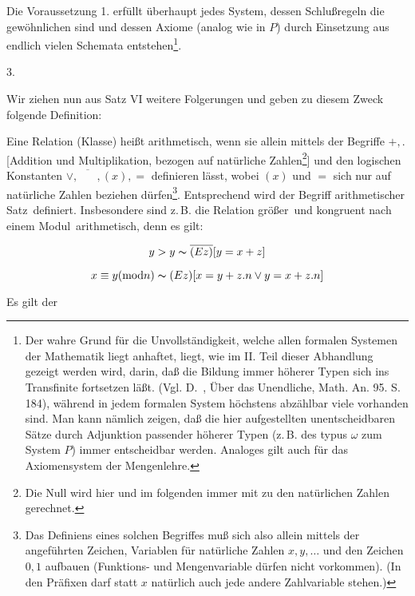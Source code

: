 \documentclass[draft]{scrartcl}
\newcommand{\fnachtundvierziga}{48a}
\let\oldleft\left
\let\oldright\right
\def\left#1{%
	    \global\advance\bracketnum1\relax 
		\colorlet{temp}{.}%
		    \csname bracketcolor\the\bracketnum\endcsname
			\oldleft#1%
			    \color{temp}%
	}
\def\right#1{%
	    \colorlet{temp}{.}%
		\csname bracketcolor\the\bracketnum\endcsname
		    \oldright#1%
			\global\advance\bracketnum-1\relax
			    \color{temp}%
	}
\def\left#1{#1}
\def\right#1{#1}
\begin{document}
\let\originalfootnote=\thefootnote
\let\thefootnote=\fnachtundvierziga
Die Voraussetzung 1. erfüllt überhaupt jedes System, dessen Schlußregeln die gewöhnlichen sind und dessen Axiome (analog wie in $P$) durch Einsetzung aus endlich vielen Schemata 
entstehen\footnote{Der wahre Grund für die
Unvollständigkeit, welche allen formalen Systemen 
der Mathematik liegt anhaftet, liegt, wie im II. 
Teil dieser Abhandlung gezeigt werden wird, darin,
daß die Bildung immer höherer Typen sich ins 
Transfinite fortsetzen läßt. (Vgl. D.~, 
Über das Unendliche, Math. An. 95. S. 184), während 
in jedem formalen System höchstens abzählbar viele
vorhanden sind. Man kann nämlich zeigen, daß die hier
aufgestellten unentscheidbaren Sätze durch Adjunktion
passender höherer Typen (z.\,B. des typus $\omega$ zum
System $P$) immer entscheidbar werden. Analoges gilt auch 
für das Axiomensystem der Mengenlehre.}.
\let\thefootnote=\originalfootnote
\setcounter{footnote}{48}

\begin{center}
3.
\end{center}

Wir ziehen nun aus Satz VI weitere Folgerungen und geben zu diesem Zweck folgende Definition:

Eine Relation (Klasse) heißt arithmetisch, wenn sie allein mittels der Begriffe $+, .$ 
[Addition und Multiplikation, bezogen auf natürliche 
Zahlen\footnote{Die Null wird hier und im folgenden immer 
mit zu den natürlichen Zahlen gerechnet.}] und den 
logischen Konstanten $\lor, \overline{\phantom{XX}}, \left(x\right), =$ definieren 
lässt, wobei $\left(x\right)$ und $=$ sich nur auf natürliche 
Zahlen beziehen dürfen\footnote{Das Definiens eines solchen
 Begriffes muß sich also allein mittels der angeführten Zeichen,
 Variablen für natürliche Zahlen $x, y, \dots$ und den Zeichen
 $0, 1$ aufbauen (Funktions- und Mengenvariable dürfen nicht vorkommen). 
(In den Präfixen darf statt $x$ natürlich auch jede andere Zahlvariable
 stehen.)}. Entsprechend wird der Begriff \glqq arithmetischer Satz\grqq\ definiert.
 Insbesondere sind z.\,B. die Relation \glqq größer\grqq\ und \glqq kongruent 
nach einem Modul\grqq\ arithmetisch, denn es gilt:

$$
y > y \thicksim \overline{\left(Ez\right)}\left[y = x + z\right]
$$

$$
x \equiv y \left(\text{mod} n\right) \thicksim \left(Ez\right) \left[x = y + z.n \lor y = x + z.n\right]
$$

Es gilt der
\end{document}
